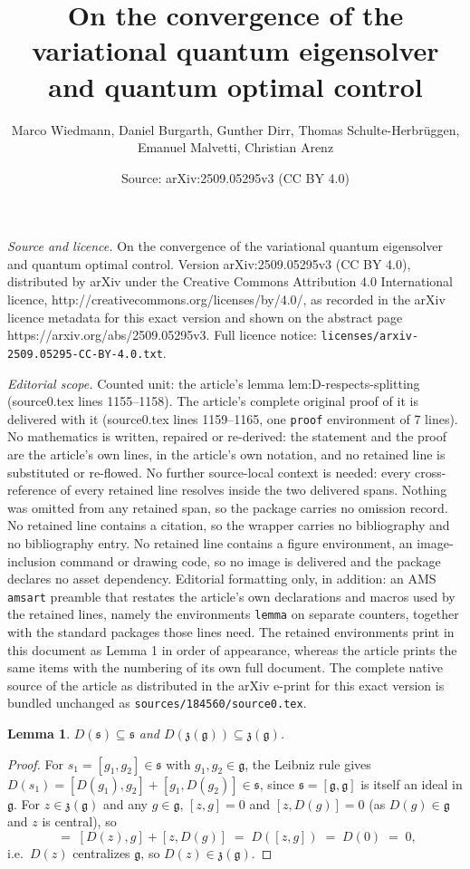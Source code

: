 \documentclass[10pt,a4paper]{amsart}
\title{On the convergence of the variational quantum eigensolver and quantum optimal control}
\author{Marco Wiedmann, Daniel Burgarth, Gunther Dirr, Thomas Schulte-Herbr\"uggen, Emanuel Malvetti, Christian Arenz}
\date{Source: arXiv:2509.05295v3 (CC BY 4.0)}
\newtheorem{lemma}{Lemma}
\begin{document}
\maketitle

\noindent\emph{Source and licence.} On the convergence of the variational quantum eigensolver and quantum optimal control. Version arXiv:2509.05295v3 (CC BY 4.0), distributed by arXiv under the Creative Commons Attribution 4.0 International licence, http://creativecommons.org/licenses/by/4.0/, as recorded in the arXiv licence metadata for this exact version and shown on the abstract page https://arxiv.org/abs/2509.05295v3. Full licence notice: \texttt{licenses/arxiv-2509.05295-CC-BY-4.0.txt}.\par\smallskip

\noindent\textit{Editorial scope.} Counted unit: the article's lemma lem:D-respects-splitting (source0.tex lines 1155--1158). The article's complete original proof of it is delivered with it (source0.tex lines 1159--1165, one \texttt{proof} environment of 7 lines). No mathematics is written, repaired or re-derived: the statement and the proof are the article's own lines, in the article's own notation, and no retained line is substituted or re-flowed.  No further source-local context is needed: every cross-reference of every retained line resolves inside the two delivered spans.  Nothing was omitted from any retained span, so the package carries no omission record.  No retained line contains a citation, so the wrapper carries no bibliography and no bibliography entry.  No retained line contains a figure environment, an image-inclusion command or drawing code, so no image is delivered and the package declares no asset dependency.  Editorial formatting only, in addition: an AMS \texttt{amsart} preamble that restates the article's own declarations and macros used by the retained lines, namely the environments \texttt{lemma} on separate counters, together with the standard packages those lines need.  The retained environments print in this document as Lemma 1 in order of appearance, whereas the article prints the same items with the numbering of its own full document.  The complete native source of the article as distributed in the arXiv e-print for this exact version is bundled unchanged as \texttt{sources/184560/source0.tex}.
\begin{lemma}
\label{lem:D-respects-splitting}
$D(\mathfrak s)\subseteq\mathfrak s$ and $D(\mathfrak z(\mathfrak g))\subseteq\mathfrak z(\mathfrak g)$.
\end{lemma}

\begin{proof}
For $s_1=[g_1,g_2]\in\mathfrak s$ with $g_1,g_2\in\mathfrak g$, the Leibniz rule gives $D(s_1)=[D(g_1),g_2]+[g_1,D(g_2)]\in\mathfrak s$, since $\mathfrak s=[\mathfrak g,\mathfrak g]$ is itself an ideal in $\mathfrak g$. For $z\in\mathfrak z(\mathfrak g)$ and any $g\in\mathfrak g$, $[z,g]=0$ and $[z,D(g)]=0$ (as $D(g)\in\mathfrak g$ and $z$ is central), so
\begin{equation}
[D(z),g] \;=\; [D(z),g]+[z,D(g)] \;=\; D([z,g]) \;=\; D(0) \;=\; 0,
\end{equation}
i.e.\ $D(z)$ centralizes $\mathfrak g$, so $D(z)\in\mathfrak z(\mathfrak g)$.
\end{proof}
\end{document}
